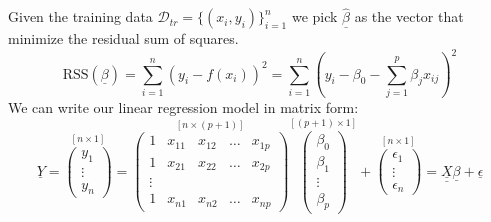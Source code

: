 Given the training data $\mathcal{D}_{tr} = \{ (x_i, y_i) \}_{i=1}^n$
we pick $\underline{\hat\beta}$ as the vector that minimize the residual sum of squares.
\[
    \text{RSS}(\underline \beta) = \sum_{i=1}^{n} (y_i - f(x_i))^2 = \sum_{i=1}^{n} \left(y_i - \beta_0 - \sum_{j=1}^{p} \beta_j x_{ij}\right)^2
\]
We can write our linear regression model in matrix form:
\[
    \underline Y =
    \overset{[n\times 1]}{
        \begin{pmatrix}
            y_1 \\ \vdots \\ y_n
        \end{pmatrix}
    } =
    \overset{[n\times(p+1)]}{
        \begin{pmatrix}
            1 & x_{11} & x_{12} & \dots & x_{1p} \\
            1 & x_{21} & x_{22} & \dots & x_{2p} \\ \vdots \\ 1 & x_{n1} & x_{n2} & \dots & x_{np}
        \end{pmatrix}
    }
    \overset{[(p+1)\times 1]}{
        \begin{pmatrix}
            \beta_0 \\ \beta_1 \\ \vdots \\ \beta_p
        \end{pmatrix}
    } +
    \overset{[n\times 1]}{
        \begin{pmatrix}
            \epsilon_1 \\
            \vdots     \\
            \epsilon_n
        \end{pmatrix}}= \underline{\underline{X}} \underline \beta + \underline \epsilon
\]


